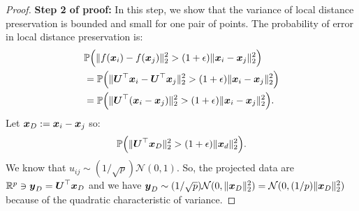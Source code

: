 \documentclass{article}
\def\b{\ensuremath\boldsymbol}
\begin{document}
\begin{proof}
\hfill \break
\textbf{Step 2 of proof:}
In this step, we show that the variance of local distance preservation is bounded and small for one pair of points. The probability of error in local distance preservation is:
\begin{align*}
&\mathbb{P}\Big(\|f(\b{x}_i) - f(\b{x}_j)\|_2^2 > (1+\epsilon) \|\b{x}_i - \b{x}_j\|_2^2\Big) \\
&= \mathbb{P}\Big(\|\b{U}^\top \b{x}_i - \b{U}^\top \b{x}_j\|_2^2 > (1+\epsilon) \|\b{x}_i - \b{x}_j\|_2^2\Big) \\
&= \mathbb{P}\Big(\|\b{U}^\top (\b{x}_i - \b{x}_j)\|_2^2 > (1+\epsilon) \|\b{x}_i - \b{x}_j\|_2^2\Big).
\end{align*}
Let $\b{x}_D := \b{x}_i - \b{x}_j$ so:
\begin{align*}
\mathbb{P}\Big(\|\b{U}^\top \b{x}_D\|_2^2 > (1+\epsilon) \|\b{x}_d\|_2^2\Big).
\end{align*}
We know that $u_{ij} \sim (1/\sqrt{p}) \mathcal{N}(0, 1)$. 
So, the projected data are $\mathbb{R}^p \ni \b{y}_D = \b{U}^\top \b{x}_D$ and we have $\b{y}_D \sim (1/\sqrt{p}) \mathcal{N}(0, \|\b{x}_D\|_2^2) = \mathcal{N}(0, (1/p)\|\b{x}_D\|_2^2)$ because of the quadratic characteristic of variance. 


\end{proof}
\end{document}
